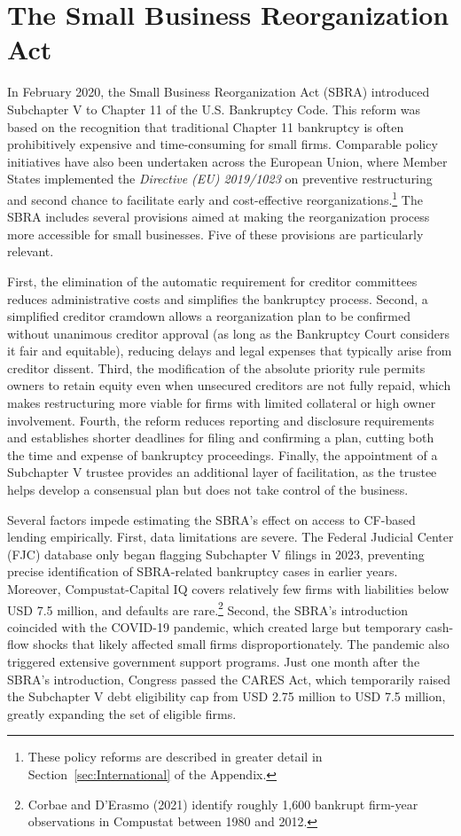 \documentclass[12pt]{article}
\begin{document}
\section{The Small Business Reorganization Act}
In February 2020, the Small Business Reorganization Act (SBRA) introduced Subchapter V to Chapter 11 of the U.S. Bankruptcy Code. This reform was based on the recognition that traditional Chapter 11 bankruptcy is often prohibitively expensive and time-consuming for small firms. Comparable policy initiatives have also been undertaken across the European Union, where Member States implemented the \textit{Directive (EU) 2019/1023} on preventive restructuring and second chance to facilitate early and cost-effective reorganizations.\footnote{These policy reforms are described in greater detail in Section~\ref{sec:International} of the Appendix.} The SBRA includes several provisions aimed at making the reorganization process more accessible for small businesses. Five of these provisions are particularly relevant.

First, the elimination of the automatic requirement for creditor committees reduces administrative costs and simplifies the bankruptcy process. Second, a simplified creditor cramdown allows a reorganization plan to be confirmed without unanimous creditor approval (as long as the Bankruptcy Court considers it fair and equitable), reducing delays and legal expenses that typically arise from creditor dissent. Third, the modification of the absolute priority rule permits owners to retain equity even when unsecured creditors are not fully repaid, which makes restructuring more viable for firms with limited collateral or high owner involvement. Fourth, the reform reduces reporting and disclosure requirements and establishes shorter deadlines for filing and confirming a plan, cutting both the time and expense of bankruptcy proceedings. Finally, the appointment of a Subchapter V trustee provides an additional layer of facilitation, as the trustee helps develop a consensual plan but does not take control of the business.

Several factors impede estimating the SBRA's effect on access to CF-based lending empirically. First, data limitations are severe. The Federal Judicial Center (FJC) database only began flagging Subchapter V filings in 2023, preventing precise identification of SBRA-related bankruptcy cases in earlier years. Moreover, Compustat-Capital IQ covers relatively few firms with liabilities below USD 7.5 million, and defaults are rare.\footnote{Corbae and D'Erasmo (2021) identify roughly 1,600 bankrupt firm-year observations in Compustat between 1980 and 2012.} Second, the SBRA's introduction coincided with the COVID-19 pandemic, which created large but temporary cash-flow shocks that likely affected small firms disproportionately. The pandemic also triggered extensive government support programs. Just one month after the SBRA's introduction, Congress passed the CARES Act, which temporarily raised the Subchapter V debt eligibility cap from USD 2.75 million to USD 7.5 million, greatly expanding the set of eligible firms. 
\end{document}
